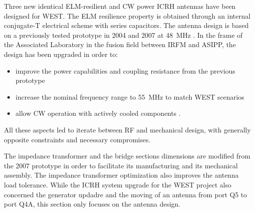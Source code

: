 Three new identical ELM-resilient and CW power ICRH antennas have been designed for WEST. The ELM resilience property is obtained through an internal conjugate-T electrical scheme with series capacitors. The antenna design is based on a previously tested prototype in 2004 and 2007 at 48~MHz . In the frame of the Associated Laboratory in the fusion field between IRFM and ASIPP, the design has been upgraded in order to: 
\begin{itemize}
	\item improve the power capabilities and coupling resistance from the previous prototype   
	\item increase the nominal frequency range to 55~MHz to match WEST scenarios
	\item allow CW operation with actively cooled components .
\end{itemize} 
All these aspects led to iterate between RF and mechanical design, with generally opposite constraints and necessary compromises. 

The impedance transformer and the bridge sections dimensions are modified from the 2007 prototype in order to facilitate its manufacturing and its mechanical assembly. The impedance transformer optimization also improves the antenna load tolerance. While the ICRH system upgrade for the WEST project also concerned the generator updadre and the moving of an antenna from port Q5 to port Q4A, this section only focuses on the antenna design. 

\subsubsection{}



